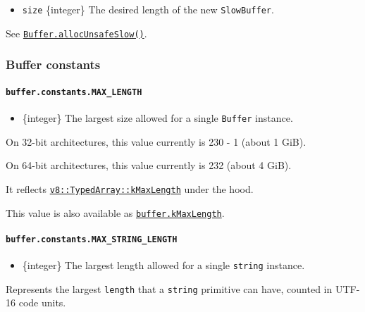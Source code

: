 \begin{itemize}
\tightlist
\item
  \texttt{size} \{integer\} The desired length of the new
  \texttt{SlowBuffer}.
\end{itemize}

See
\hyperref[static-method-bufferallocunsafeslowsize]{\texttt{Buffer.allocUnsafeSlow()}}.

\subsubsection{Buffer constants}\label{buffer-constants}

\paragraph{\texorpdfstring{\texttt{buffer.constants.MAX\_LENGTH}}{buffer.constants.MAX\_LENGTH}}\label{buffer.constants.max_length}

\begin{itemize}
\tightlist
\item
  \{integer\} The largest size allowed for a single \texttt{Buffer}
  instance.
\end{itemize}

On 32-bit architectures, this value currently is 230 - 1 (about 1 GiB).

On 64-bit architectures, this value currently is 232 (about 4 GiB).

It reflects
\href{https://v8.github.io/api/head/classv8_1_1TypedArray.html\#a54a48f4373da0850663c4393d843b9b0}{\texttt{v8::TypedArray::kMaxLength}}
under the hood.

This value is also available as
\hyperref[bufferkmaxlength]{\texttt{buffer.kMaxLength}}.

\paragraph{\texorpdfstring{\texttt{buffer.constants.MAX\_STRING\_LENGTH}}{buffer.constants.MAX\_STRING\_LENGTH}}\label{buffer.constants.max_string_length}

\begin{itemize}
\tightlist
\item
  \{integer\} The largest length allowed for a single \texttt{string}
  instance.
\end{itemize}

Represents the largest \texttt{length} that a \texttt{string} primitive
can have, counted in UTF-16 code units.


